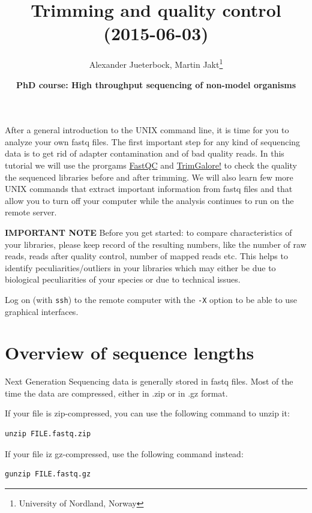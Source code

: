 \documentclass[11pt]{article}
\author{Alexander Jueterbock, Martin Jakt\thanks{University of Nordland, Norway}}
\date{\textbf{PhD course: High throughput sequencing of non-model organisms}}
\title{\textbf{Trimming and quality control} (2015-06-03)}
\begin{document}
\maketitle
\tableofcontents







After a general introduction to the UNIX command line, it is time for
you to analyze your own fastq files. The first important step for any
kind of sequencing data is to get rid of adapter contamination and of
bad quality reads. In this tutorial we will use the prorgams \href{http://www.bioinformatics.babraham.ac.uk/projects/fastqc/}{FastQC}
and \href{http://www.bioinformatics.babraham.ac.uk/projects/trim_galore/}{TrimGalore!} to check the quality the sequenced libraries before
and after trimming. We will also learn few more UNIX commands that
extract important information from fastq files and that allow you to
turn off your computer while the analysis continues to run on the
remote server.


\textbf{IMPORTANT NOTE} Before you get started: to compare characteristics of
your libraries, please keep record of the resulting numbers, like the
number of raw reads, reads after quality control, number of mapped
reads etc. This helps to identify peculiarities/outliers in your
libraries which may either be due to biological peculiarities of your
species or due to technical issues.


Log on (with \texttt{ssh}) to the remote computer with the \texttt{-X} option to be
able to use graphical interfaces.

\section{Overview of sequence lengths}
\label{sec-1}
Next Generation Sequencing data is generally stored in fastq
files. Most of the time the data are compressed, either in .zip or in
.gz format.

If your file is zip-compressed, you can use the following command to unzip it:

\begin{verbatim}
unzip FILE.fastq.zip
\end{verbatim}

If your file iz gz-compressed, use the following command instead:

\begin{verbatim}
gunzip FILE.fastq.gz
\end{verbatim}
\end{document}
